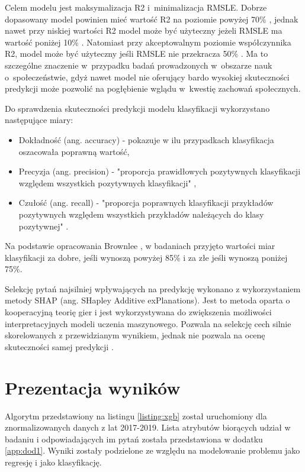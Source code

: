 Celem modelu jest maksymalizacja R2 i~minimalizacja RMSLE. Dobrze dopasowany model powinien mieć wartość R2 na poziomie powyżej 70\% \cite{r2-good-value}, jednak nawet przy niskiej wartości R2 model może być użyteczny jeżeli RMSLE ma wartość poniżej 10\% \cite{r2-vs-rmse}.
Natomiast przy akceptowalnym poziomie współczynnika R2, model może być użyteczny jeśli RMSLE nie przekracza 50\% \cite{rmse-good-value}.
Ma to szczególne znaczenie w~przypadku badań prowadzonych w~obszarze nauk o~społeczeństwie, gdyż nawet model nie oferujący bardo wysokiej skuteczności predykcji może pozwolić na pogłębienie wglądu w~kwestię zachowań społecznych.

Do sprawdzenia skuteczności predykcji modelu klasyfikacji wykorzystano następujące miary:
\begin{itemize}
    \item Dokładność (ang. accuracy) - pokazuje w ilu przypadkach klasyfikacja oszacowała poprawną wartość,
    \item Precyzja (ang. precision) - "proporcja prawidłowych pozytywnych klasyfikacji względem wszystkich pozytywnych klasyfikacji" \cite{recall-precision},
    \item Czułość (ang. recall) - "proporcja poprawnych klasyfikacji przykładów pozytywnych względem wszystkich przykładów należących do klasy pozytywnej" \cite{recall-precision}.
\end{itemize}

Na podstawie opracowania Brownlee \cite{accuracy-level}, w badaniach przyjęto wartości miar klasyfikacji za dobre, jeśli wynoszą powyżej 85\% i za złe jeśli wynoszą poniżej 75\%.

Selekcję pytań najsilniej wpływających na predykcję wykonano z wykorzystaniem metody SHAP (ang. SHapley Additive exPlanations).
Jest to metoda oparta o kooperacyjną teorię gier i jest wykorzystywana do zwiększenia możliwości interpretacyjnych modeli uczenia maszynowego.
Pozwala na selekcję cech silnie skorelowanych z przewidzianym wynikiem, jednak nie pozwala na ocenę skuteczności samej predykcji \cite{shap}.


\section{Prezentacja wyników}\label{sec:analysis:important-features}

Algorytm przedstawiony na listingu \ref{listing:xgb} został uruchomiony dla znormalizowanych danych z lat 2017-2019.
Lista atrybutów biorących udział w badaniu i odpowiadających im pytań została przedstawiona w dodatku \ref{app:dod1}.
Wyniki zostały podzielone ze względu na modelowanie problemu jako regresję i jako klasyfikację.

